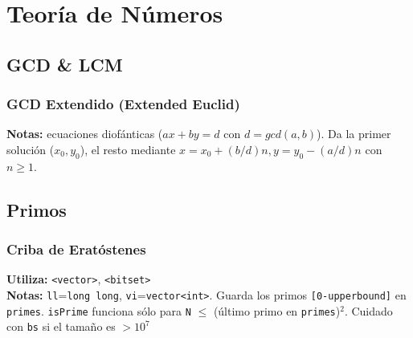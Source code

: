 \section{Teor\'ia de N\'umeros}
\subsection{GCD \& LCM}

\subsubsection{GCD Extendido (Extended Euclid)}
\begin{footnotesize}
	\textbf{Notas:} ecuaciones diof\'anticas ($ax+by=d$ con $d=gcd(a,b)$). Da la primer soluci\'on ($x_{0},y_{0}$), el resto mediante $x=x_{0}+(b/d)n, y=y_{0}-(a/d)n$ con $n \geq 1$.
\end{footnotesize}

\subsection{Primos}
\subsubsection{Criba de Erat\'ostenes}
\begin{footnotesize}
	\textbf{Utiliza:} \texttt{<vector>}, \texttt{<bitset>}\\
	\textbf{Notas:} \texttt{ll}=\texttt{long long}, \texttt{vi}=\texttt{vector<int>}. Guarda los primos \texttt{[0-upperbound]} en \texttt{primes}. \texttt{isPrime} funciona s\'olo para \texttt{N} $\leq$ (\'ultimo primo en \texttt{primes})$^{2}$. Cuidado con \texttt{bs} si el tama\~no es $> 10^{7}$
\end{footnotesize}
